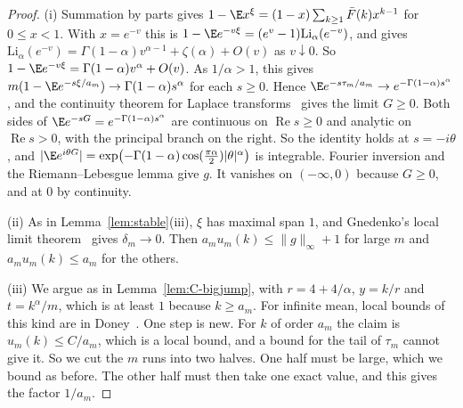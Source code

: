 \begin{proof}
(i) Summation by parts gives $1-\E x^\xi=(1-x)\sum_{k\ge1}\bar F(k)x^{k-1}$ for
$0\le x<1$. With $x=e^{-v}$ this is
$1-\E e^{-v\xi}=(e^v-1)\mathrm{Li}_\alpha(e^{-v})$, and \cite[25.12.12]{dlmf} gives
$\mathrm{Li}_\alpha(e^{-v})=\Gamma(1-\alpha)v^{\alpha-1}+\zeta(\alpha)+O(v)$ as
$v\downarrow0$. So $1-\E e^{-v\xi}=\Gamma(1-\alpha)v^\alpha+O(v)$. As $1/\alpha>1$, this
gives $m(1-\E e^{-s\xi/a_m})\to\Gamma(1-\alpha)s^\alpha$ for each $s\ge0$. Hence
$\E e^{-s\tau_m/a_m}\to e^{-\Gamma(1-\alpha)s^\alpha}$, and the continuity theorem for
Laplace transforms~\cite[Section~XIII.1]{feller1971} gives the limit $G\ge0$. Both
sides of $\E e^{-sG}=e^{-\Gamma(1-\alpha)s^\alpha}$ are continuous on
$\operatorname{Re}s\ge0$ and analytic on $\operatorname{Re}s>0$, with the principal
branch on the right. So the identity holds at $s=-i\theta$, and
$\lvert\E e^{i\theta G}\rvert=\exp\bigl(-\Gamma(1-\alpha)\cos(\frac{\pi\alpha}2)\lvert
\theta\rvert^\alpha\bigr)$ is integrable. Fourier inversion and the Riemann--Lebesgue
lemma give $g$. It vanishes on $(-\infty,0)$ because $G\ge0$, and at $0$ by continuity.

(ii) As in Lemma~\ref{lem:stable}(iii), $\xi$ has maximal span $1$, and Gnedenko's local
limit theorem~\cite[Theorem~4.2.1]{ibragimovlinnik1971} gives $\delta_m\to0$. Then
$a_mu_m(k)\le\lVert g\rVert_\infty+1$ for large $m$ and $a_mu_m(k)\le a_m$ for the
others.

(iii) We argue as in Lemma~\ref{lem:C-bigjump}, with $r=4+4/\alpha$, $y=k/r$ and
$t=k^\alpha/m$, which is at least $1$ because $k\ge a_m$. For infinite mean, local bounds
of this kind are in Doney~\cite{doney1997}. One step is new. For $k$ of
order $a_m$ the claim is $u_m(k)\le C/a_m$, which is a local bound, and a bound for the
tail of $\tau_m$ cannot give it. So we cut the $m$ runs into two halves. One half must be
large, which we bound as before. The other half must then take one exact value, and this
gives the factor $1/a_m$.


\end{proof}
